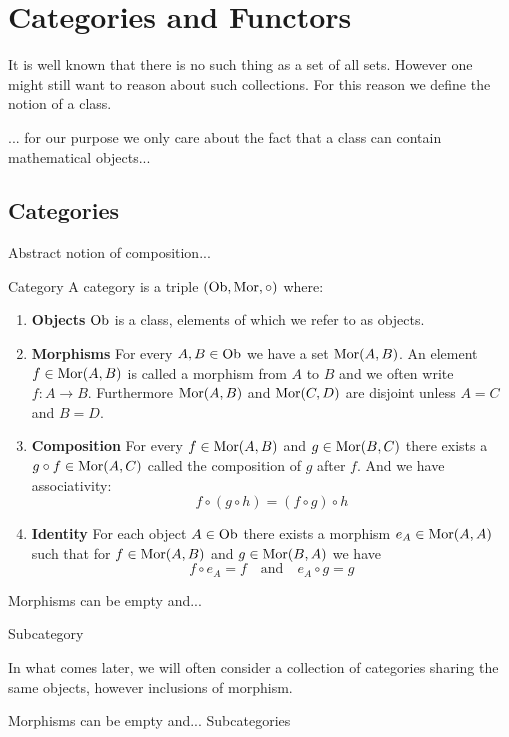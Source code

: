 \chapter{Categories and Functors}
It is well known \source that there is no such thing as a set of all sets. However one might still want to reason about such collections. For this reason we define the notion of a class.

... for our purpose we only care about the fact that a class can contain mathematical objects...

\section{Categories}
Abstract notion of composition...

\begin{definition}{Category}{}
\cite{Roman2017} \source A category is a triple $(\mathrm {Ob}, \mathrm {Mor}, \circ)$ where:
\begin{enumerate}
    \item \textbf{Objects} $\mathrm {Ob}$ is a class, elements of which we refer to as objects.
    
    \item \textbf{Morphisms} For every $A, B \in \mathrm {Ob}$ we have a set $\mathrm {Mor}(A,B)$. An element $f \in \mathrm {Mor}(A,B)$ is called a morphism from $A$ to $B$ and we often write $f: A \to B$. Furthermore $\mathrm {Mor}(A,B)$ and $\mathrm {Mor}(C,D)$ are disjoint unless $A = C$ and $B = D$.
    
    \item \textbf{Composition} For every $f \in \mathrm {Mor}(A,B)$ and $g \in \mathrm {Mor}(B,C)$ there exists a $g \circ f \in \mathrm {Mor}(A,C)$ called the composition of $g$ after $f$. And we have associativity: 
    $$
    f \circ (g \circ h) = (f \circ g) \circ h
    $$

    \item \textbf{Identity} For each object $A \in \mathrm {Ob}$ there exists a morphism $e_A \in \mathrm {Mor}(A,A)$ such that for $f \in \mathrm {Mor}(A,B)$ and $g \in \mathrm {Mor}(B,A)$ we have
    $$
    f \circ e_A = f \quad \text{and} \quad e_A \circ g = g
    $$
\end{enumerate}
\end{definition}

Morphisms can be empty and...

\begin{definition}{Subcategory}{}
\source

In what comes later, we will often consider a collection of categories sharing the same objects, however inclusions of morphism.
\end{definition}
\begin{myremark}{}{}
Morphisms can be empty and... Subcategories
\end{myremark}


